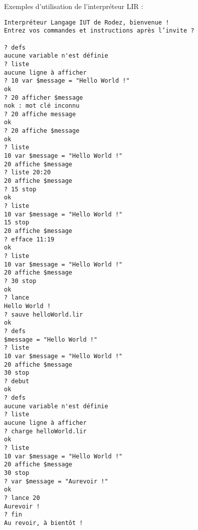 Exemples d'utilisation de l'interpréteur LIR :
\begin{verbatim}
Interpréteur Langage IUT de Rodez, bienvenue !
Entrez vos commandes et instructions après l’invite ? 

? defs
aucune variable n'est définie
? liste
aucune ligne à afficher
? 10 var $message = "Hello World !"
ok
? 20 afficher $message
nok : mot clé inconnu
? 20 affiche message
ok
? 20 affiche $message
ok
? liste
10 var $message = "Hello World !"
20 affiche $message
? liste 20:20
20 affiche $message
? 15 stop
ok
? liste
10 var $message = "Hello World !"
15 stop
20 affiche $message
? efface 11:19
ok
? liste
10 var $message = "Hello World !"
20 affiche $message
? 30 stop
ok
? lance
Hello World !
? sauve helloWorld.lir
ok
? defs
$message = "Hello World !"
? liste
10 var $message = "Hello World !"
20 affiche $message
30 stop
? debut
ok
? defs
aucune variable n'est définie
? liste
aucune ligne à afficher
? charge helloWorld.lir
ok
? liste
10 var $message = "Hello World !"
20 affiche $message
30 stop
? var $message = "Aurevoir !"
ok
? lance 20
Aurevoir !
? fin
Au revoir, à bientôt !
\end{verbatim}

